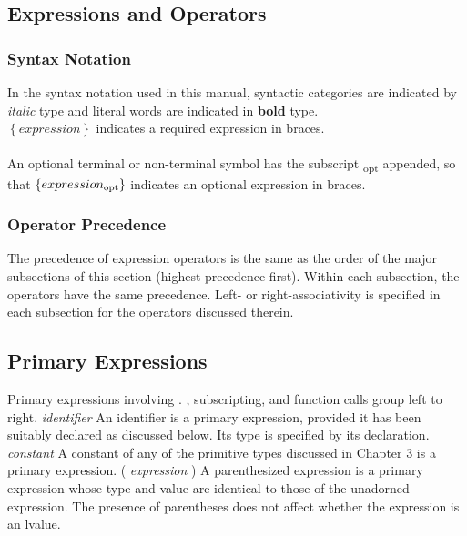 \begin{homeworkProblem}
	\chapter{Expressions and Operators}
    \subsection{Syntax Notation}
    In the syntax notation used in this manual, syntactic categories are indicated by \textit{italic} type and literal words are indicated in \textbf{bold} type.\\
    \textit{ $\left\{ expression \right\}$ }
    indicates a required expression in braces.
    \\
    \\
    An optional terminal or non-terminal symbol has the subscript \textsubscript{opt} appended, so that
    \textit{ $\left\{ expression\textsubscript{opt}\right\}$ }
    indicates an optional expression in braces.
    
    \subsection{Operator Precedence}
    The precedence of expression operators is the same as the order of the major subsections of this section (highest precedence first). Within each subsection, the operators have the same precedence. Left- or right-associativity is specified in each subsection for the operators discussed therein.
	\section{Primary Expressions}
	Primary expressions involving . , subscripting, and function calls group left to right.
    \newline	
    \newline
    \textit{identifier}
    \newline
    An identifier is a primary expression, provided it has been suitably declared as discussed below. Its type is specified by its declaration.
   \newline
   \newline
	\textit{constant}
    \newline
    A constant of any of the primitive types discussed in Chapter 3 is a primary expression.
    \newline
    \newline
    ( \textit{expression} )
    \newline
    A parenthesized expression is a primary expression whose type and value are identical to those of the unadorned expression. The presence of parentheses does not affect whether the expression is an lvalue.
    

\end{homeworkProblem}
